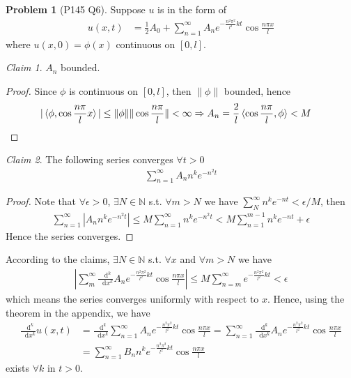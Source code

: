 \documentclass[twoside,11pt]{article}
\newcommand{\N}{\mathbb{N}}
\renewcommand*\d{\mathop{}\!\mathrm{d}}
\theoremstyle{definition}
\newtheorem{problem}{Problem}
\theoremstyle{remark}
\newtheorem*{claim}{Claim}
\begin{document}
\begin{problem}[P145 Q6]
Suppose $u$ is in the form of 
\begin{align*}
    u(x,t) &= \frac{1}{2}A_0 + 
    \sum_{n=1}^\infty A_ne^{-\frac{n^2\pi^2}{l^2}kt}
    \cos\frac{n\pi x}{l}
\end{align*}
where $u(x,0)=\phi(x)$ continuous on $[0, l]$.
\begin{claim}
$A_n$ bounded.
\end{claim}
\begin{proof}
Since $\phi$ is continuous on $[0, l]$, then $\|\phi\|$ bounded, hence
\begin{align*}
    |\braket{\phi, \cos\frac{n\pi}{l}x}| &\leq
    \|\phi\| \|\cos\frac{n\pi}{l}\| < \infty
    \Rightarrow
    A_n = \frac{2}{l}\braket{\cos\frac{n\pi}{l},\phi} < M\qedhere
\end{align*}
\end{proof}

\begin{claim}
The following series converges $\forall t>0$
\begin{align*}
    \sum_{n=1}^\infty A_n n^k e^{-n^2t}
\end{align*}
\end{claim}
\begin{proof}
Note that $\forall\epsilon>0$, $\exists N\in\N$ s.t.
$\forall m > N$ we have
$\sum_N^\infty n^k e^{-nt} < \epsilon/M$, then
\begin{align*}
    \sum_{n=1}^\infty |A_n n^k e^{-n^2t}|
    \leq M \sum_{n=1}^\infty n^k e^{-n^2 t}
    < M\sum_{n=1}^{m-1} n^k e^{-nt} + \epsilon
\end{align*}
Hence the series converges.
\end{proof}
According to the claims, $\exists N\in\N$ s.t. 
$\forall x $ and $\forall m>N$ we have
\begin{align*}
    \left|\sum_{m}^\infty
    \frac{\d^k}{\d x^k}A_n e^{-\frac{n^2\pi^2}{l^2}kt}\cos\frac{n\pi x}{l}
    \right| 
    \leq 
    M\sum_{n=m}^\infty e^{-\frac{n^2\pi^2}{l^2}kt}
    < \epsilon
\end{align*}
which means the series converges uniformly with respect to $x$.
Hence, using the theorem in the appendix,
we have
\begin{align*}
    \frac{\d^k}{\d x^k}u(x, t) &= 
    \frac{\d^k}{\d x^k}
    \sum_{n=1}^\infty
    A_n e^{-\frac{n^2\pi^2}{l^2}kt}\cos\frac{n\pi x}{l}
    = 
    \sum_{n=1}^\infty
    \frac{\d^k}{\d x^k}
    A_n e^{-\frac{n^2\pi^2}{l^2}kt}\cos\frac{n\pi x}{l}\\
    &= 
    \sum_{n=1}^\infty
    B_n n^k e^{-\frac{n^2\pi^2}{l^2}kt}\cos\frac{n\pi x}{l} 
\end{align*}
exists $\forall k$ in $t>0$.

\end{problem}
\end{document}
